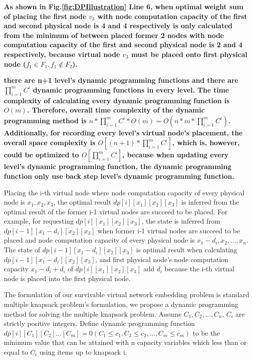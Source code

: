 \textbf{
As shown in Fig.\ref{fig:DPIllustration} Line 6, when optimal weight sum of placing the first node $v_3$ with node computation capacity of the first and second physical node is 4 and 4 respectively is only calculated from the minimum of between placed former 2 nodes with node computation capacity of the first and second physical node is 2 and 4 respectively, because virtual node $v_3$ must be placed onto first physical node ($f_1\in F_1,f_1\notin F_2$).
}

\textbf{there are n+1 level's dynamic programming functions and there are $\prod_{i=1}^{m}C^i$ dynamic programming functions in every level. The time complexity of calculating every dynamic programming function is $O(m)$. Therefore, overall time complexity of the dynamic programming method is $n*\prod_{i=1}^{m}C^i*O(m)=O(n*m*\prod_{i=1}^{m}C^i)$. Additionally, for recording every level's virtual node's placement, the overall space complexity is $O[(n+1)*\prod_{i=1}^{m}C^i]$, which is, however, could be optimized to $O[\prod_{i=1}^{m}C^i]$, because when updating every level's dynamic programming function, the dynamic programming function only use back step level's dynamic programming function.}

Placing the i-th virtual node where node computation capacity of every physical node is $x_1,x_2,x_3$, the optimal result $dp[i][{x_1}][{x_2}][{x_3}]$ is inferred from the optimal result of the former i-1 virtual nodes are succeed to be placed. For example, for requesting $dp[i][{x_1}][{x_2}][{x_3}]$, the state is inferred from $dp[i-1][{x_1-d_i}][{x_2}][{x_3}]$ when former i-1 virtual nodes are succeed to be placed and node computation capacity of every physical node is $x_1-d_i,x_2,\ldots,x_n$. The state of $dp[i-1][{x_1-d_i}][{x_2}][{x_3}]$ is optimal result when calculating $dp[i-1][{x_1-d_i}][{x_2}][{x_3}]$, and first physical node's node computation capacity $x_1-d_i+d_i$  of $dp[i][{x_1}][{x_2}][{x_3}]$ add $d_i$ because the i-th virtual node is placed into the first physical node.


The formulation of our survivable virtual network embedding problem is standard multiple knapsack problem's formulation, we propose a dynamic programming method for solving the multiple knapsack problem. Assume $C_1,C_2,\ldots,C_n$, $C_i$ are strictly positive integers. Define dynamic programming function $dp[i][{C_1}][{C_2}] \ldots [{C_m}]=0(C_1\leq c_1,C_2\leq c_2,\ldots,C_m\leq c_m)$ to be the minimum value that can be attained with n capacity variables  which less than or equal to $C_i$ using items up to knapsack i.

